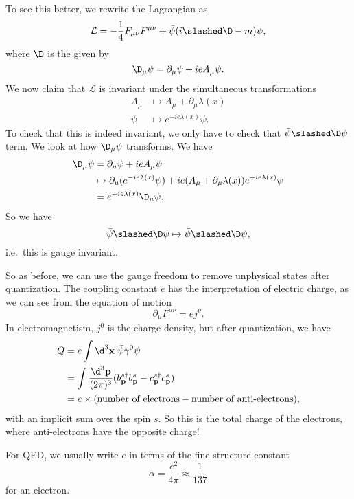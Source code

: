 \documentclass[a4paper]{article}
\begin{document}
To see this better, we rewrite the Lagrangian as
\[
  \mathcal{L} = -\frac{1}{4} F_{\mu\nu} F^{\mu\nu} + \bar\psi(i \slashed \D - m)\psi,
\]
where $\D$ is the  given by
\[
  \D_\mu \psi = \partial_\mu \psi + i e A_\mu \psi.
\]
We now claim that $\mathcal{L}$ is invariant under the simultaneous transformations
\begin{align*}
  A_\mu &\mapsto A_\mu + \partial_\mu \lambda(x)\\
  \psi &\mapsto e^{-ie \lambda(x)} \psi.
\end{align*}
To check that this is indeed invariant, we only have to check that $\bar\psi\slashed \D \psi$ term. We look at how $\D_\mu \psi$ transforms. We have
\begin{align*}
  \D_\mu \psi &= \partial_\mu \psi + ie A_\mu \psi\\
  &\mapsto \partial_\mu (e^{-ie\lambda(x)} \psi) + ie (A_\mu + \partial_\mu \lambda(x)) e^{-ie\lambda(x)}\psi\\
  &= e^{-ie\lambda(x)} \D_\mu\psi.
\end{align*}
So we have
\[
  \bar\psi \slashed \D \psi \mapsto \bar\psi \slashed \D \psi,
\]
i.e.\ this is gauge invariant.

So as before, we can use the gauge freedom to remove unphysical states after quantization. The coupling constant $e$ has the interpretation of electric charge, as we can see from the equation of motion
\[
  \partial_\mu F^{\mu\nu} = ej^\nu.
\]
In electromagnetism, $j^0$ is the charge density, but after quantization, we have
\begin{align*}
  Q &= e \int \d^3 \mathbf{x}\; \bar\psi \gamma^0 \psi \\
  &= \int \frac{\d^3 \mathbf{p}}{(2\pi)^3} (b_\mathbf{p}^{s\dagger} b_\mathbf{p}^s - c_\mathbf{p}^{s\dagger} c_\mathbf{p}^s)\\
  &= e \times (\text{number of electrons} - \text{number of anti-electrons}),
\end{align*}
with an implicit sum over the spin $s$. So this is the total charge of the electrons, where anti-electrons have the opposite charge!

For QED, we usually write $e$ in terms of the fine structure constant
\[
  \alpha = \frac{e^2}{4\pi} \approx \frac{1}{137}
\]
for an electron.
\end{document}

